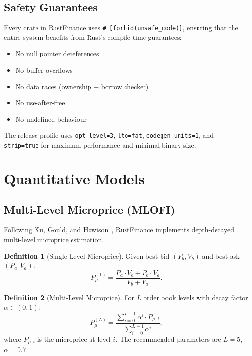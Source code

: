 \documentclass[11pt]{article}
\theoremstyle{definition}
\newtheorem{definition}{Definition}[section]
\begin{document}
\subsection{Safety Guarantees}

Every crate in RustFinance uses \texttt{\#![forbid(unsafe\_code)]},
ensuring that the entire system benefits from Rust's compile-time
guarantees:
\begin{itemize}[leftmargin=*,topsep=2pt,itemsep=1pt]
  \item No null pointer dereferences
  \item No buffer overflows
  \item No data races (ownership + borrow checker)
  \item No use-after-free
  \item No undefined behaviour
\end{itemize}

The release profile uses \texttt{opt-level=3}, \texttt{lto=fat},
\texttt{codegen-units=1}, and \texttt{strip=true} for maximum
performance and minimal binary size.

\section{Quantitative Models}
\label{sec:quant}

\subsection{Multi-Level Microprice (MLOFI)}
\label{sec:microprice}

Following Xu, Gould, and Howison~\cite{xu2019}, RustFinance
implements depth-decayed multi-level microprice estimation.

\begin{definition}[Single-Level Microprice]
Given best bid $(P_b, V_b)$ and best ask $(P_a, V_a)$:
\begin{equation}
  P_{\mu}^{(1)} = \frac{P_a \cdot V_b + P_b \cdot V_a}{V_b + V_a}.
  \label{eq:microprice-l1}
\end{equation}
\end{definition}

\begin{definition}[Multi-Level Microprice]
For $L$ order book levels with decay factor $\alpha \in (0,1)$:
\begin{equation}
  P_{\mu}^{(L)} = \frac{\sum_{i=0}^{L-1} \alpha^i \cdot P_{\mu,i}}
                        {\sum_{i=0}^{L-1} \alpha^i},
  \label{eq:microprice-ml}
\end{equation}
where $P_{\mu,i}$ is the microprice at level $i$.
The recommended parameters are $L=5$, $\alpha=0.7$.
\end{definition}
\end{document}

